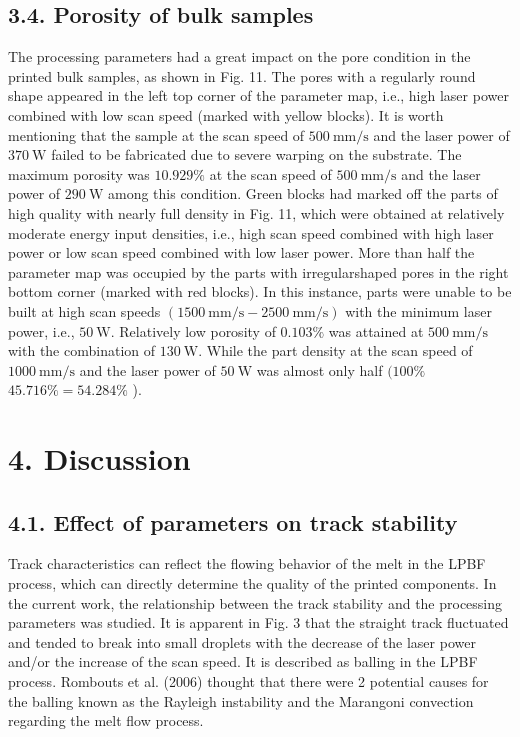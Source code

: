 \documentclass[10pt]{article}
\begin{document}
\subsection*{3.4. Porosity of bulk samples}
The processing parameters had a great impact on the pore condition in the printed bulk samples, as shown in Fig. 11. The pores with a regularly round shape appeared in the left top corner of the parameter map, i.e., high laser power combined with low scan speed (marked with yellow blocks). It is worth mentioning that the sample at the scan speed of $500 \mathrm{~mm} / \mathrm{s}$ and the laser power of $370 \mathrm{~W}$ failed to be fabricated due to severe warping on the substrate. The maximum porosity was $10.929 \%$ at the scan speed of $500 \mathrm{~mm} / \mathrm{s}$ and the laser power of $290 \mathrm{~W}$ among this condition. Green blocks had marked off the parts of high quality with nearly full density in Fig. 11, which were obtained at relatively moderate energy input densities, i.e., high scan speed combined with high laser power or low scan speed combined with low laser power. More than half the parameter map was occupied by the parts with irregularshaped pores in the right bottom corner (marked with red blocks). In this instance, parts were unable to be built at high scan speeds $(1500 \mathrm{~mm} / \mathrm{s}-2500 \mathrm{~mm} / \mathrm{s})$ with the minimum laser power, i.e., $50 \mathrm{~W}$. Relatively low porosity of $0.103 \%$ was attained at $500 \mathrm{~mm} / \mathrm{s}$ with the combination of $130 \mathrm{~W}$. While the part density at the scan speed of $1000 \mathrm{~mm} / \mathrm{s}$ and the laser power of $50 \mathrm{~W}$ was almost only half $(100 \%$ $45.716 \%=54.284 \%$ ).

\section*{4. Discussion}
\subsection*{4.1. Effect of parameters on track stability}
Track characteristics can reflect the flowing behavior of the melt in the LPBF process, which can directly determine the quality of the printed components. In the current work, the relationship between the track stability and the processing parameters was studied. It is apparent in Fig. 3 that the straight track fluctuated and tended to break into small droplets with the decrease of the laser power and/or the increase of the scan speed. It is described as balling in the LPBF process. Rombouts et al. (2006) thought that there were 2 potential causes for the balling known as the Rayleigh instability and the Marangoni convection regarding the melt flow process.
\end{document}
